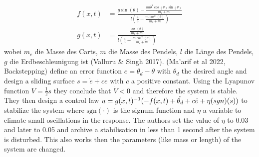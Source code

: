 \begin{align}
    f(x,t) &= \frac{g\sin(\theta) - \frac{ml\dot{\theta}^2\cos(\theta)\sin(\theta)}{m_c+m}}{l\left(\frac{4}{3}-\frac{m\cos^2(\theta)}{m_c+m}\right)} \\
    g(x,t) &= \frac{\frac{\cos(\theta)}{m_c+m}}{l\left(\frac{4}{3}-\frac{m\cos^2(\theta)}{m_c+m}\right)}
\end{align}
wobei $m_c$ die Masse des Carts, $m$ die Masse des Pendels, $l$ die Länge des Pendels, $g$ die Erdbeschleunigung ist (Valluru & Singh 2017). (Ma'arif et al 2022, Backstepping) define an error function $e = \theta_d - \theta$ with $\theta_d$ the desired angle and design a sliding surface $s = \dot{e} + c e$ with $c$ a positive constant. Using the Lyapunov function $V=\frac{1}{2}s$ they conclude that $\dot{V}<0$ and therefore the system is stable. They then design a control law $u = g(x,t)^{-1}(-f(x,t) +\ddot{\theta_d} + c\dot{e} + \eta\text(sgn)(s))$ to stabilize the system where $\text{sgn}(\cdot)$ is the signum function and $\eta$ a variable to elimate small oscillations in the response. The authors set the value of $\eta$ to 0.03 and later to 0.05 and archive a stabilisation in less than 1 second after the system is disturbed. This also works then the parameters (like mass or length) of the system are changed.
